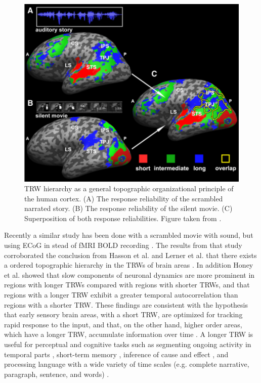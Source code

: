 \begin{figure}[!ht]
\centering
\includegraphics[scale=0.38]{hierarchy_figures/temporal_hierarchy_story_movie}
\caption{
TRW hierarchy as a general topographic organizational principle of the human cortex.
(A) The response reliability of the scrambled narrated story. (B) The response reliability of the silent movie. (C) Superposition of both response reliabilities. 
Figure taken from \cite{lerner2011topographic}.
}
\label{fig:timescale_hierarchy_story_movie}
\end{figure}
Recently a similar study has been done with a scrambled movie with sound, but using ECoG in stead of fMRI BOLD recording \cite{honey2012slow}. The results from that study corroborated the conclusion from Hasson et al. and Lerner et al. that there exists a ordered topographic hierarchy in the TRWs of brain areas \cite{lerner2011topographic, hasson2008hierarchy}.
In addition Honey et al. showed that slow components of neuronal dynamics are more prominent in regions with longer TRWs compared with regions with shorter TRWs, and that regions with a longer TRW exhibit a greater temporal autocorrelation than regions with a shorter TRW.
These findings are consistent with the hypothesis that early sensory brain areas, with a short TRW, are optimized for tracking rapid response to the input, and that, on the other hand, higher order areas, which have a longer TRW, accumulate information over time \cite{huk2005neural, ogawa2010differential, romo1999neuronal, shadlen2001neural, wang2002probabilistic}.
A longer TRW is useful for perceptual and cognitive tasks such as segmenting ongoing activity in temporal parts \cite{zacks2001human,hasson2008hierarchy}, short-term memory \cite{hasson2015hierarchical, durstewitz2000neurocomputational}, inference of cause and effect \cite{fonlupt2003perception}, and processing language with a wide variety of time scales (e.g. complete narrative, paragraph, sentence, and words) \cite{xu2005language, lerner2011topographic}.
